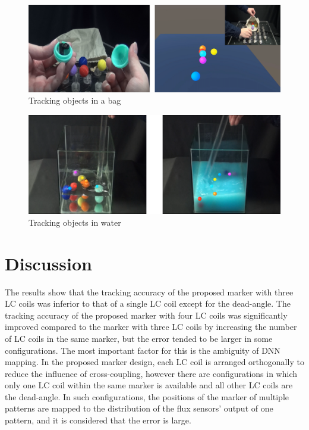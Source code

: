 \documentclass[journal,twoside,web]{ieeecolor}
\begin{document}
\begin{figure}[t]
    \centerline{\includegraphics[width=\columnwidth]{figure/capsule_cloth.png}}
    \caption{Tracking objects in a bag}
    \label{capsule_cloth}
\end{figure}
\begin{figure}[t]
    \centerline{\includegraphics[width=\columnwidth]{figure/capsule_water.png}}
    \caption{Tracking objects in water}
    \label{capsule_water}
\end{figure}

\section{Discussion}
The results show that the tracking accuracy of the proposed marker with three LC coils was inferior to that of a single LC coil except for the dead-angle. The tracking accuracy of the proposed marker with four LC coils was significantly improved compared to the marker with three LC coils by increasing the number of LC coils in the same marker, but the error tended to be larger in some configurations. The most important factor for this is the ambiguity of DNN mapping. In the proposed marker design, each LC coil is arranged orthogonally to reduce the influence of cross-coupling, however there are configurations in which only one LC coil within the same marker is available and all other LC coils are the dead-angle. In such configurations, the positions of the marker of multiple patterns are mapped to the distribution of the flux sensors' output of one pattern, and it is considered that the error is large.
\end{document}
